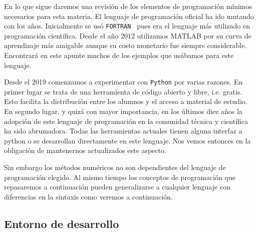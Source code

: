 \newcommand\minilogo{
  \texttt{[image: ./media/Matlab\_Logo.png]}
}

{
En lo que sigue daremos una revisión
de los elementos de programación 
mínimos necesarios para esta materia.
El lenguaje de programación oficial ha ido mutando con los años. Inicialmente se usó \texttt{FORTRAN } 
pues era el lenguaje más utilizado en programación científica. 
Desde el año 2012 utilizamos MATLAB por su curva de aprendizaje más amigable aunque su costo monetario fue siempre considerable.
Encontrará en este apunte muchos de los ejemplos que usábamos para este lenguaje. 

Desde el 2019 comenzamos a experimentar con \texttt{Python} por varias razones. 
En primer lugar se trata de una herramienta de código abierto y libre, i.e. gratis. 
Esto facilita la distribución entre los alumnos y el acceso a material de estudio. 
En segundo lugar, y quizá con mayor importancia, en los últimos diez años la adopción de este lenguaje de programación en la comunidad técnica y científica ha sido abrumadora. 
Todas las herramientas actuales tienen alguna interfaz a python o se desarrollan directamente en este lenguaje.
Nos vemos entonces en la obligación de mantenernos actualizados este aspecto. 

Sin embargo los métodos numéricos no son dependientes del lenguaje de programación elegido. 
Al mismo tiempo los conceptos de programación que repasaremos a continuación pueden generalizarse a cualquier lenguaje con diferencias en la sintaxis como veremos a continuación. 




}

\subsection{Entorno de desarrollo}

